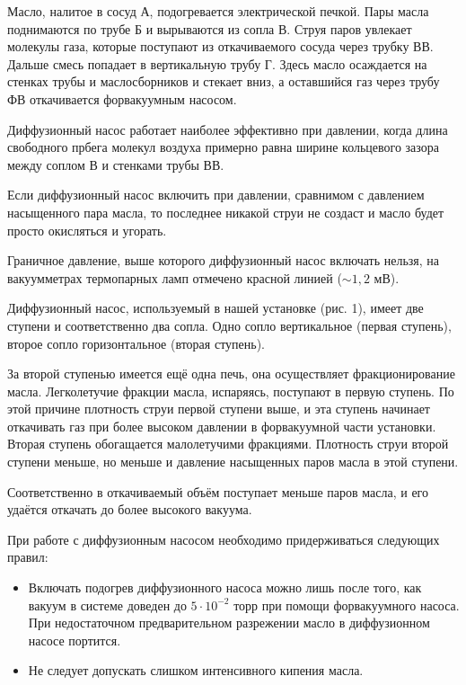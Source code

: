 \documentclass[a4paper,12pt]{article} %
\begin{document}
Масло, налитое в сосуд А, подогревается электрической печкой. Пары масла поднимаются по трубе Б и вырываются из сопла В. Струя паров увлекает молекулы газа, которые поступают из откачиваемого сосуда через трубку ВВ. Дальше смесь попадает в вертикальную трубу Г. Здесь масло осаждается на стенках трубы и маслосборников и стекает вниз, а оставшийся газ через трубу ФВ откачивается форвакуумным насосом. 

Диффузионный насос работает наиболее эффективно при давлении, когда длина свободного прбега молекул воздуха примерно равна ширине кольцевого зазора между соплом В и стенками трубы ВВ. 

Если диффузионный насос включить при давлении, сравнимом с давлением насыщенного пара масла, то последнее никакой струи не создаст и масло будет просто окисляться и угорать.

Граничное давление, выше которого диффузионный насос включать нельзя, на вакуумметрах термопарных ламп отмечено красной линией ($\sim 1,2$ мВ).

\medskip 

Диффузионный насос, используемый в нашей установке (рис. 1), имеет две ступени и соответственно два сопла. Одно сопло вертикальное (первая ступень), второе сопло горизонтальное (вторая ступень). 

За второй ступенью имеется ещё одна печь, она осуществляет фракционирование масла. Легколетучие фракции масла, испаряясь, поступают в первую ступень. По этой причине плотность струи первой ступени выше, и эта ступень начинает откачивать газ при более высоком давлении в форвакуумной части установки. Вторая ступень обогащается малолетучими фракциями. Плотность струи второй ступени меньше, но меньше и давление насыщенных паров масла в этой ступени. 

Соответственно в откачиваемый объём поступает меньше паров масла, и его удаётся откачать до более высокого вакуума.

\medskip

При работе с диффузионным насосом необходимо придерживаться следующих правил:
\begin{itemize}
  \item Включать подогрев диффузионного насоса можно лишь после того, как вакуум в системе доведен до $5 \cdot 10^{-2}$ торр при помощи форвакуумного насоса. При недостаточном предварительном разрежении масло в диффузионном насосе портится.
  \item Не следует допускать слишком интенсивного кипения масла.
\end{itemize}
\end{document}
